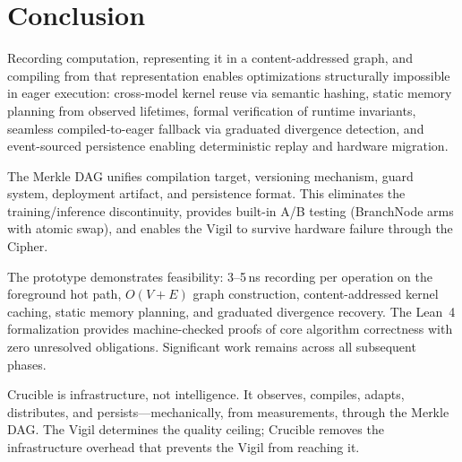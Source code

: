 
\section{Conclusion}\label{sec:conclusion}

Recording computation, representing it in a content-addressed graph, and compiling from that representation enables optimizations structurally impossible in eager execution: cross-model kernel reuse via semantic hashing, static memory planning from observed lifetimes, formal verification of runtime invariants, seamless compiled-to-eager fallback via graduated divergence detection, and event-sourced persistence enabling deterministic replay and hardware migration.

The Merkle DAG unifies compilation target, versioning mechanism, guard system, deployment artifact, and persistence format.
This eliminates the training/inference discontinuity, provides built-in A/B testing (BranchNode arms with atomic swap), and enables the Vigil to survive hardware failure through the Cipher.

The prototype demonstrates feasibility: 3--5\,ns recording per operation on the foreground hot path, $O(V{+}E)$ graph construction, content-addressed kernel caching, static memory planning, and graduated divergence recovery.
The Lean~4 formalization provides machine-checked proofs of core algorithm correctness with zero unresolved obligations.
Significant work remains across all subsequent phases.

Crucible is infrastructure, not intelligence.
It observes, compiles, adapts, distributes, and persists---mechanically, from measurements, through the Merkle DAG.
The Vigil determines the quality ceiling; Crucible removes the infrastructure overhead that prevents the Vigil from reaching it.
